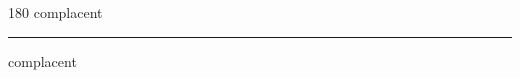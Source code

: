 
\begin{frame}
\begin{center}
\begin{turn}{180}
{\fontsize{2.5cm}{1em}\selectfont complacent}
\end{turn}
\vspace{1em}\par  
\hrule
\vspace{1em}\par  
{\fontsize{2.5cm}{1em}\selectfont complacent}
\end{center}
\end{frame}
